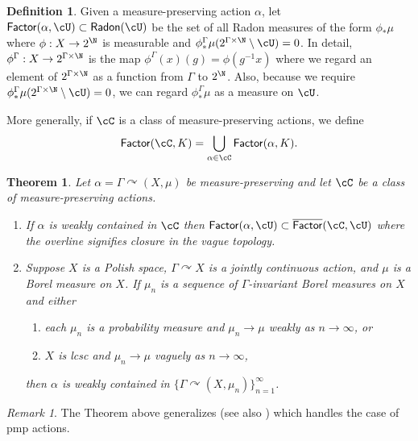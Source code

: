 \documentclass[12pt]{article}
\theoremstyle{plain}
\newtheorem{thm}{Theorem}[section]
\theoremstyle{definition}
\newtheorem{defn}{Definition}
\theoremstyle{remark}
\newtheorem{remark}{Remark}
\newcommand{\G}{\Gamma}
\renewcommand\a{\alpha}
\newcommand\Radon{\mathsf{Radon}}
\def\cc{{\curvearrowright}}
\begin{document}
\begin{defn}
   Given a measure-preserving action $\a$, let $\mathsf{Factor}(\a,\cU) \subset \Radon(\cU)$ be the set of all Radon measures of the form $\phi_*\mu$ where $\phi:X \to 2^\N$ is measurable  and $\phi^\G_*\mu(2^{\G\times \N}\setminus \cU)=0$. In detail, $\phi^\G:X \to 2^{\G\times \N}$ is the map $\phi^\G(x)(g)=\phi(g^{-1}x)$ where we regard an element of $2^{\G\times \N}$ as a function from $\G$ to $2^\N$. Also, because we require $\phi^\G_*\mu(2^{\G\times \N}\setminus \cU)=0$, we can regard $\phi^\G_*\mu$ as a measure on $\cU$.
   
   More generally, if $\cC$ is a class of measure-preserving actions, we define
$$\mathsf{Factor}(\cC,K)=\bigcup_{\a\in \cC} \mathsf{Factor}(\a,K).$$ 
\end{defn}


\begin{thm}\label{T:Abert-Weiss2}
Let $\a=\G \cc (X,\mu)$ be measure-preserving and let $\cC$ be a class of measure-preserving actions. 
\begin{enumerate}
    \item If $\a$ is weakly contained in $\cC$ then $\mathsf{Factor}(\a,\cU) \subset \overline{\mathsf{Factor}}(\cC,\cU)$ where the overline signifies closure in the vague topology.
    \item Suppose $X$ is a Polish space, $\G \cc X$ is a jointly continuous action, and $\mu$ is a Borel measure on $X$. If $\mu_n$ is a sequence of $\G$-invariant Borel measures on $X$ and either
    \begin{enumerate}
        \item each $\mu_n$ is a probability measure and $\mu_n \to \mu$ weakly as $n\to\infty$, or
        \item $X$ is lcsc and $\mu_n \to \mu$ vaguely as $n\to\infty$,
    \end{enumerate}
    then $\a$ is weakly contained in $\{\G \cc (X,\mu_n)\}_{n=1}^\infty$.
\end{enumerate}
\end{thm}

\begin{remark}
    The Theorem above generalizes \cite[Lemma 8]{abert-weiss-2013} (see also \cite[Prop. 3.6]{T-D12}) which handles the case of pmp actions.
\end{remark}
\end{document}
